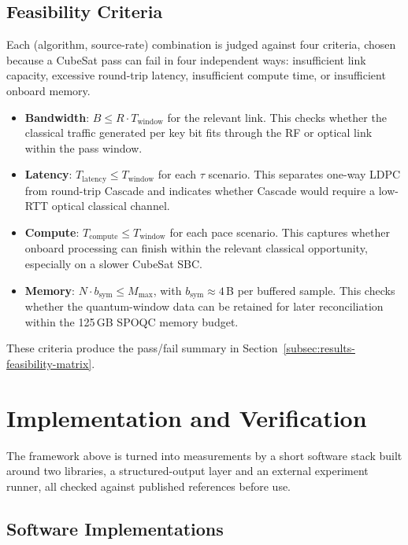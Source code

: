 \documentclass{UoYCSproject}
\begin{document}
\subsection{Feasibility Criteria}
\label{subsec:meth-feasibility}

Each (algorithm, source-rate) combination is judged against four criteria,
chosen because a CubeSat pass can fail in four independent ways: insufficient
link capacity, excessive round-trip latency, insufficient compute time, or
insufficient onboard memory.
\begin{itemize}
    \item \textbf{Bandwidth}: $B \le R \cdot T_{\text{window}}$ for the relevant link. This checks whether the classical traffic generated per key bit fits through the RF or optical link within the pass window.
    \item \textbf{Latency}: $T_{\text{latency}} \le T_{\text{window}}$ for each $\tau$ scenario. This separates one-way LDPC from round-trip Cascade and indicates whether Cascade would require a low-RTT optical classical channel.
    \item \textbf{Compute}: $T_{\text{compute}} \le T_{\text{window}}$ for each pace scenario. This captures whether onboard processing can finish within the relevant classical opportunity, especially on a slower CubeSat SBC.
    \item \textbf{Memory}: $N \cdot b_{\text{sym}} \le M_{\max}$, with $b_{\text{sym}} \approx 4$\,B per buffered sample. This checks whether the quantum-window data can be retained for later reconciliation within the 125\,GB SPOQC memory budget.
\end{itemize}
These criteria produce the pass/fail summary in
Section~\ref{subsec:results-feasibility-matrix}.

\section{Implementation and Verification}
\label{sec:meth-implementation}

The framework above is turned into measurements by a short software stack
built around two libraries, a structured-output layer and an external
experiment runner, all checked against published references before use.

\subsection{Software Implementations}
\label{subsec:meth-implementations}
\end{document}
